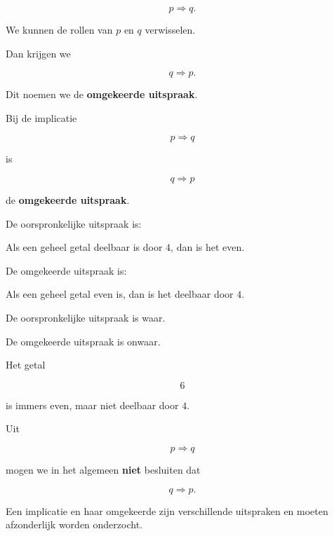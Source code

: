 \documentclass{ximera}
\begin{document}
\[
p\Rightarrow q.
\]

We kunnen de rollen van $p$ en $q$ verwisselen.

Dan krijgen we

\[
q\Rightarrow p.
\]

Dit noemen we de \textbf{omgekeerde uitspraak}.


\begin{definitie}

Bij de implicatie

\[
p\Rightarrow q
\]

is

\[
q\Rightarrow p
\]

de \textbf{omgekeerde uitspraak}.

\end{definitie}


\begin{voorbeeld}

De oorspronkelijke uitspraak is:

\begin{center}
Als een geheel getal deelbaar is door $4$, dan is het even.
\end{center}

De omgekeerde uitspraak is:

\begin{center}
Als een geheel getal even is, dan is het deelbaar door $4$.
\end{center}

De oorspronkelijke uitspraak is waar.

De omgekeerde uitspraak is onwaar.

Het getal

\[
6
\]

is immers even, maar niet deelbaar door $4$.

\end{voorbeeld}


\begin{opmerking}

Uit

\[
p\Rightarrow q
\]

mogen we in het algemeen \textbf{niet} besluiten dat

\[
q\Rightarrow p.
\]

Een implicatie en haar omgekeerde zijn verschillende uitspraken en
moeten afzonderlijk worden onderzocht.

\end{opmerking}
\end{document}
